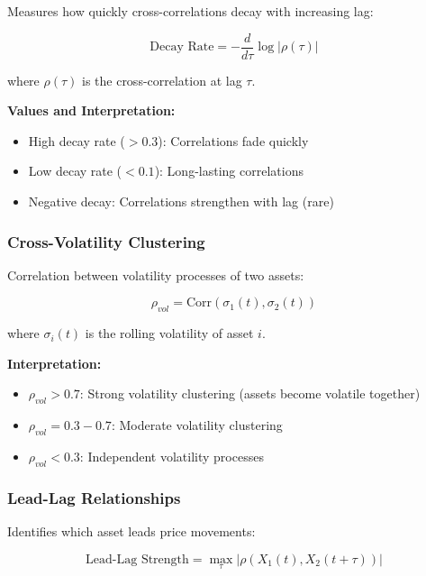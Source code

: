\documentclass[11pt,a4paper]{article}
\begin{document}
Measures how quickly cross-correlations decay with increasing lag:

\begin{equation}
\text{Decay Rate} = -\frac{d}{d\tau} \log|\rho(\tau)|
\end{equation}

where $\rho(\tau)$ is the cross-correlation at lag $\tau$.

\textbf{Values and Interpretation:}
\begin{itemize}
    \item High decay rate ($> 0.3$): Correlations fade quickly
    \item Low decay rate ($< 0.1$): Long-lasting correlations
    \item Negative decay: Correlations strengthen with lag (rare)
\end{itemize}

\subsubsection{Cross-Volatility Clustering}

Correlation between volatility processes of two assets:

\begin{equation}
\rho_{vol} = \text{Corr}(\sigma_1(t), \sigma_2(t))
\end{equation}

where $\sigma_i(t)$ is the rolling volatility of asset $i$.

\textbf{Interpretation:}
\begin{itemize}
    \item $\rho_{vol} > 0.7$: Strong volatility clustering (assets become volatile together)
    \item $\rho_{vol} = 0.3-0.7$: Moderate volatility clustering
    \item $\rho_{vol} < 0.3$: Independent volatility processes
\end{itemize}

\subsubsection{Lead-Lag Relationships}

Identifies which asset leads price movements:

\begin{equation}
\text{Lead-Lag Strength} = \max_{\tau} |\rho(X_1(t), X_2(t+\tau))|
\end{equation}
\end{document}
